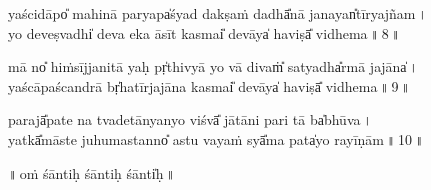 \documentclass[parskip, DIV=14]{scrartcl}
\begin{document}
yaści॒dāpo̎ mahi॒nā pa॒ryapa̍śya॒d dakṣa॒ṁ dadhā̎nā ja॒nayan̎tīrya॒jñam\,। \\
yo de॒veṣvadhi̍ de॒va eka॒ āsī॒t kasmai̎ de॒vāya̍ ha॒viṣā̎ vidhema\,॥\,8\,॥ \par 

mā no̎ hiṁsījjani॒tā yaḥ pṛ̍thi॒vyā yo vā॒ divaṁ̎ sa॒tyadha̎rmā ja॒jāna̍\,। \\
yaścā॒paśca॒ndrā bṛ̍ha॒tīrja॒jāna॒ kasmai̎ de॒vāya̍ ha॒viṣā̎ vidhema\,॥\,9\,॥ \par 

parajā̎pate॒ na tvade॒tānya॒nyo viśvā̎ jā॒tāni॒ pari॒ tā ba̍bhūva\,। \\
yatkā̎māste juhu॒mastanno̎ astu va॒yaṁ syā̎ma॒ pata̍yo rayī॒ṇām\,॥\,10\,॥ \par 
 
 \vspace{0.5cm}
 
\begin{center}
 ॥\,oṁ śānti॒ḥ śānti॒ḥ śānti̍ḥ\,॥

\end{center}
\end{document}
